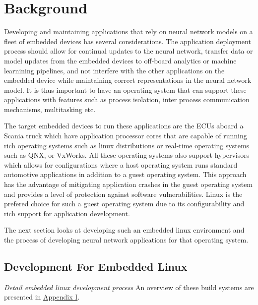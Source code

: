 
\chapter{Background}

Developing and maintaining applications that rely on neural network models on a fleet of embedded devices has several considerations. The application deployment process should allow for continual updates to the neural network, transfer data or model updates from the embedded devices to off-board analytics or machine learnining pipelines, and not interfere with the other applications on the embedded device while maintaining correct representations in the neural network model. It is thus important to have an operating system that can support these applications with features such as process isolation, inter process communication mechanisms, multitasking etc.

The target embedded devices to run these applications are the ECUs aboard a Scania truck which have application processor cores that are capable of running rich operating systems such as linux distributions or real-time operating systems such as QNX, or VxWorks. All these operating systems also support hypervisors which allows for configurations where a host operating system runs standard automotive applications in addition to a guest operating system. This approach has the advantage of mitigating application crashes in the guest operating system and provides a level of protection against software vulnerabilities. Linux is the prefered choice for such a guest operating system due to its configurability and rich support for application development.

The next section looks at developing such an embedded linux environment and the process of developing neural network applications for that operating system.

\section[Development Process for Embedded Linux]{Development For Embedded Linux}
\textit{Detail embedded linux development process}
An overview of these build systems are presented in \hyperref[buildsystems]{Appendix I}.

